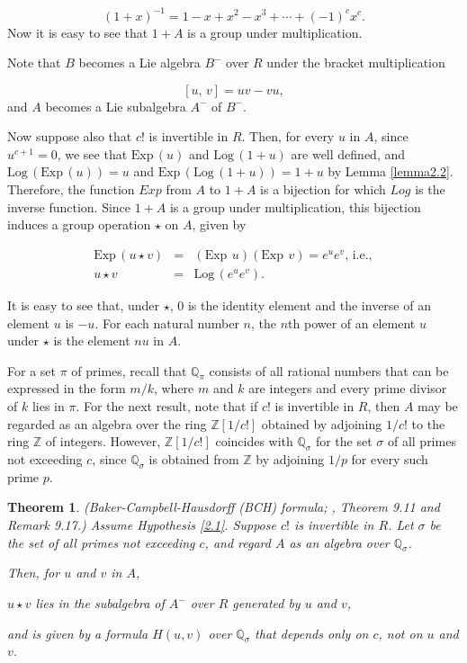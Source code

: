 \documentclass[mathscr]{amsart}
\theoremstyle{theorem}
\newtheorem{theorem}{Theorem}[section]
\theoremstyle{definition}
\numberwithin{equation}{section}
\def \({\left(}
\def \){\right)}
\def \Exp{\text{Exp}\,}
\def \Log{\text{Log}\,}
\begin{document}
$$(1+x)^{-1}=1-x+x^2-x^3+\cdots+(-1)^c x^c.$$
Now it is easy to see that $1+A$ is a group under multiplication.

Note that $B$ becomes a Lie algebra $B^{-}$ over $R$ under the
bracket multiplication

$$[u,\,v]=uv-vu,$$
and $A$ becomes a Lie subalgebra $A^-$ of $B^-$.

Now suppose also that $c!$ is invertible in $R$.  Then, for every
$u$ in $A$, since $u^{c+1}=0$, we see that $\Exp(u)$ and $\Log(1+u)$
are well defined, and $\Log\(\Exp(u)\)=u$ and
$\Exp\(\Log(1+u)\)=1+u$ by Lemma \ref{lemma2.2}. Therefore, the
function $Exp$ from $A$ to $1+A$ is a bijection for which $Log$ is
the inverse function.  Since $1+A$ is a group under multiplication,
this bijection induces a group operation $\star$ on $A$, given by

\begin{eqnarray*}
\Exp\(u\star v\)&=&\(\Exp\ u\)\(\Exp\ v\)=e^u e^v,\,\text{i.e.},\\
u\star v&=&\Log\(e^u e^v\).
\end{eqnarray*}

It is easy to see that, under $\star$, $0$ is the identity element
and the inverse of an element $u$ is $-u$.  For each natural number
$n$, the $n$th power of an element $u$ under $\star$ is the element
$nu$ in $A$.

For a set $\pi$ of primes, recall that $\mathbb{Q}_\pi$ consists of
all rational numbers that can be expressed in the form $m/k$, where
$m$ and $k$ are integers and every prime divisor of $k$ lies in
$\pi$.  For the next result, note that if $c!$ is invertible in $R$,
then $A$ may be regarded as an algebra over the ring
$\mathbb{Z}[1/c!]$ obtained by adjoining $1/c!$ to the ring
$\mathbb{Z}$ of integers.  However, $\mathbb{Z}[1/c!]$ coincides
with $\mathbb{Q}_\sigma$ for the set $\sigma$ of all primes not
exceeding $c$, since $\mathbb{Q}_\sigma$ is obtained from
$\mathbb{Z}$ by adjoining $1/p$ for every such prime $p$.

\begin{theorem}{(Baker-Campbell-Hausdorff (BCH) formula; \cite{Kh}, Theorem 9.11 %
and Remark 9.17.)} %
Assume Hypothesis \ref{2.1}. Suppose $c!$ is invertible in $R$.  Let
$\sigma$ be the set of all primes not exceeding $c$, and regard $A$
as an algebra over $\mathbb{Q}_\sigma$.

Then, for $u$ and $v$ in $A$,

\begin{center}
$u\star v$ lies in the subalgebra of $A^-$ over $R$ generated by $u$
and $v$,
\end{center}
 \smallskip

\noindent and is given by a formula $H(u,v)$ over
$\mathbb{Q}_\sigma$ that depends only on $c$, not on $u$ and $v$.

\label{theo2.4}
\end{theorem}
\end{document}
